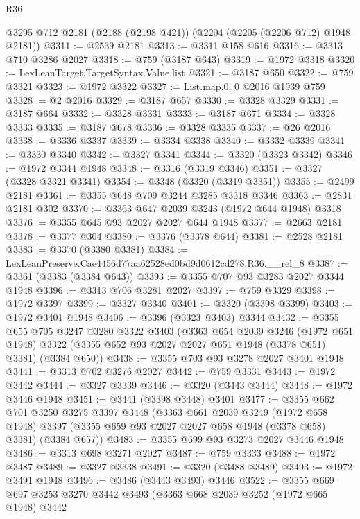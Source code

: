 \begin{lexlean}{R36}
\begin{coremodule}
    @3295
    @712
    @2181
    (@2188 (@2198 @421))
    (@2204 (@2205 (@2206 @712) @1948 @2181))
@3311 := @2539 @2181
@3313 := @3311 @158 @616
@3316 := @3313 @710 @3286 @2027
@3318 := @759 (@3187 @643)
@3319 := @1972 @3318
@3320 := LexLeanTarget.TargetSyntax.Value.list
@3321 := @3187 @650
@3322 := @759 @3321
@3323 := @1972 @3322
@3327 := List.map.{0, 0} @2016 @1939 @759
@3328 := @2 @2016
@3329 := @3187 @657
@3330 := @3328 @3329
@3331 := @3187 @664
@3332 := @3328 @3331
@3333 := @3187 @671
@3334 := @3328 @3333
@3335 := @3187 @678
@3336 := @3328 @3335
@3337 := @26 @2016
@3338 := @3336 @3337
@3339 := @3334 @3338
@3340 := @3332 @3339
@3341 := @3330 @3340
@3342 := @3327 @3341
@3344 := @3320 (@3323 @3342)
@3346 := @1972 @3344 @1948
@3348 := @3316 (@3319 @3346)
@3351 := @3327 (@3328 @3321 @3341)
@3354 := @3348 (@3320 (@3319 @3351))
@3355 := @2499 @2181
@3361 := @3355 @648 @709 @3244 @3285 @3318 @3346
@3363 := @2831 @2181 @302
@3370 := @3363 @647 @2039 @3243 (@1972 @644 @1948) @3318
@3376 := @3355 @645 @93 @2027 @2027 @644 @1948
@3377 := @2663 @2181
@3378 := @3377 @304
@3380 := @3376 (@3378 @644)
@3381 := @2528 @2181
@3383 := @3370 (@3380 @3381)
@3384 := LexLeanPreserve.Cae4456d77aa62528ed0bd9d0612cd278.R36.__rel_8
@3387 := @3361 (@3383 (@3384 @643))
@3393 := @3355 @707 @93 @3283 @2027 @3344 @1948
@3396 := @3313 @706 @3281 @2027
@3397 := @759 @3329
@3398 := @1972 @3397
@3399 := @3327 @3340
@3401 := @3320 (@3398 @3399)
@3403 := @1972 @3401 @1948
@3406 := @3396 (@3323 @3403) @3344
@3432 := @3355
    @655
    @705
    @3247
    @3280
    @3322
    @3403
    (@3363
      @654
      @2039
      @3246
      (@1972 @651 @1948)
      @3322
      (@3355 @652 @93 @2027 @2027 @651 @1948 (@3378 @651) @3381)
      (@3384 @650))
@3438 := @3355 @703 @93 @3278 @2027 @3401 @1948
@3441 := @3313 @702 @3276 @2027
@3442 := @759 @3331
@3443 := @1972 @3442
@3444 := @3327 @3339
@3446 := @3320 (@3443 @3444)
@3448 := @1972 @3446 @1948
@3451 := @3441 (@3398 @3448) @3401
@3477 := @3355
    @662
    @701
    @3250
    @3275
    @3397
    @3448
    (@3363
      @661
      @2039
      @3249
      (@1972 @658 @1948)
      @3397
      (@3355 @659 @93 @2027 @2027 @658 @1948 (@3378 @658) @3381)
      (@3384 @657))
@3483 := @3355 @699 @93 @3273 @2027 @3446 @1948
@3486 := @3313 @698 @3271 @2027
@3487 := @759 @3333
@3488 := @1972 @3487
@3489 := @3327 @3338
@3491 := @3320 (@3488 @3489)
@3493 := @1972 @3491 @1948
@3496 := @3486 (@3443 @3493) @3446
@3522 := @3355
    @669
    @697
    @3253
    @3270
    @3442
    @3493
    (@3363
      @668
      @2039
      @3252
      (@1972 @665 @1948)
      @3442

\end{coremodule}
\end{lexlean}
